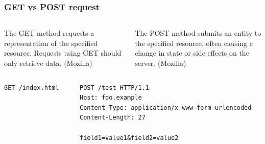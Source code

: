 \documentclass[compress, aspectratio=32]{beamer}
\begin{document}
\begin{frame}[fragile]
    \frametitle{GET vs POST request}
    \begin{columns}
        \begin{column}[]{0.5\textwidth}
            \begin{definition}[GET]
                The GET method requests a representation of the specified resource. Requests using GET should only retrieve data. (Mozilla)
            \end{definition}
            
        \end{column}
        \begin{column}[]{0.5\textwidth}
            \begin{definition}[POST]
                The POST method submits an entity to the specified resource, often causing a change in state or side effects on the server. (Mozilla)
            \end{definition}
        \end{column}
    \end{columns}
    \begin{columns}
        \begin{column}[]{0.5\textwidth}
            
            \begin{lstlisting}[numbers=none]
GET /index.html
            \end{lstlisting}
        \end{column}
        \begin{column}[]{0.5\textwidth}
            
            \begin{lstlisting}[numbers=none]
POST /test HTTP/1.1
Host: foo.example
Content-Type: application/x-www-form-urlencoded
Content-Length: 27

field1=value1&field2=value2

            \end{lstlisting}
        \end{column}
    \end{columns}
\end{frame}
\end{document}
